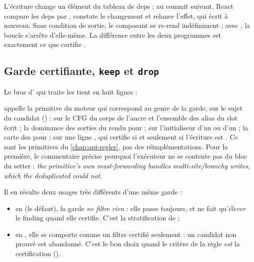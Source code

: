 \begin{react}
L'écriture change un élément du tableau de deps ; au commit suivant, React compare les deps par , constate le changement et relance l'effet, qui écrit à nouveau. Sans condition de sortie, le composant se re-rend indéfiniment ; avec , la boucle s'arrête d'elle-même. La différence entre les deux programmes est exactement ce que certifie .
\end{react}

\subsection{Garde certifiante, \texttt{keep} et \texttt{drop}}

Le bras d' qui traite les  tient en huit lignes :


 appelle la primitive du moteur qui correspond au genre de la garde, sur le sujet du candidat () :  sur le CFG du corps de l'ancre et l'ensemble des alias du slot écrit ; la dominance des sorties du rendu pour  ;  sur l'initialiseur d'un  ou d'un  ; la carte des  pour  ;  sur une ligne , qui certifie si et seulement si l'écriture est . Ce sont les primitives du \cref{chap:api-regles}, pas des réimplémentations. Pour la première, le commentaire précise pourquoi l'exécuteur ne se contente pas du bloc du setter : \og \emph{the primitive's own must-forwarding handles multi-site/branchy writes, which the deduplicated  could not}\fg{}.

Il en résulte deux usages très différents d'une même garde :
\begin{itemize}
  \item en  (le défaut), la garde \emph{ne filtre rien} : elle passe toujours, et ne fait qu'\emph{élever} le finding quand elle certifie. C'est la stratification de  ;
  \item en , elle se comporte comme un filtre \og certifié seulement\fg{} : un candidat non prouvé est abandonné. C'est le bon choix quand le critère de la règle \emph{est} la certification ().
\end{itemize}


